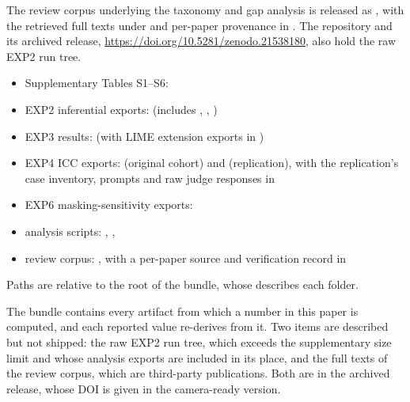 \documentclass[10pt]{article}
\begin{document}
The review corpus underlying the taxonomy and gap analysis is released as
, with the retrieved
full texts under  and per-paper
provenance in .
The repository and its archived release,
\url{https://doi.org/10.5281/zenodo.21538180}, also hold the raw EXP2 run
tree.
\else
\begin{sloppypar}
\begin{itemize}[leftmargin=*]
\item Supplementary Tables S1--S6: 
\item EXP2 inferential exports: 
(includes ,
,
)
\item EXP3 results: 
(with LIME extension exports in )
\item EXP4 ICC exports: 
(original cohort) and  (replication),
with the replication's case inventory, prompts and raw judge responses in
\item EXP6 masking-sensitivity exports:
\item analysis scripts: ,
,
\item review corpus: , with a
per-paper source and verification record in
\end{itemize}
\end{sloppypar}
Paths are relative to the root of the bundle, whose 
describes each folder.

The bundle contains every artifact from which a number in this paper is
computed, and each reported value re-derives from it. Two items are
described but not shipped: the raw EXP2 run tree, which exceeds the
supplementary size limit and whose analysis exports are included in its place,
and the full texts of the review corpus, which are third-party publications.
Both are in the archived release, whose DOI is given in the camera-ready
version.
\fi

\end{document}
